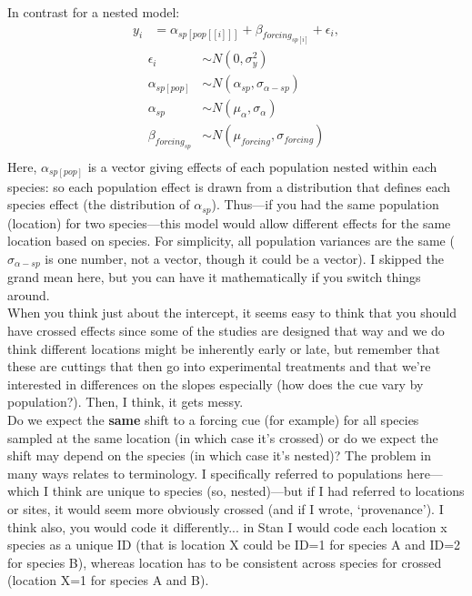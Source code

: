 \documentclass[11pt,letter]{article}
\begin{document}
In contrast for a nested model:
\begin{align*}
y_i &= \alpha_{sp[pop[[i]]]} + \beta_{forcing_{sp[i]}}  + \epsilon_i,
\end{align*}
\begin{align*}
\epsilon_i & \sim N(0,\sigma^2_y) \\
\alpha_{sp[pop]} & \sim N(\alpha_{sp}, \sigma_{\alpha-sp}) \\
\alpha_{sp} & \sim N(\mu_{\alpha}, \sigma_{\alpha}) \\
\beta_{forcing_{sp}} & \sim N(\mu_{forcing}, \sigma_{forcing}) \\
\end{align*}
Here, $\alpha_{sp[pop]}$ is a vector giving effects of each population nested within each species: so each population effect is drawn from a distribution that defines each species effect (the distribution of $\alpha_{sp}$). Thus---if you had the same population (location) for two species---this model would allow different effects for the same location based on species. For simplicity, all population variances are the same ($\sigma_{\alpha-sp}$ is one number, not a vector, though it could be a vector). I skipped the grand mean here, but you can have it mathematically if you switch things around. \\

When you think just about the intercept, it seems easy to think that you should have crossed effects since some of the studies are designed that way and we do think different locations might be inherently early or late, but remember that these are cuttings that then go into experimental treatments and that we're interested in differences on the slopes especially (how does the cue vary by population?). Then, I think, it gets messy.\\

Do we expect the {\bf same} shift to a forcing cue (for example) for all species sampled at the same location (in which case it's crossed) or do we expect the shift may depend on the species (in which case it's nested)? The problem in many ways relates to terminology. I specifically referred to populations here---which I think are unique to species (so, nested)---but if I had referred to locations or sites, it would seem more obviously crossed (and if I wrote, `provenance'). I think also, you would code it differently... in Stan I would code each location x species as a unique ID (that is location X could be ID=1 for species A and ID=2 for species B), whereas location has to be consistent across species for crossed (location X=1 for species A and B). \\
\end{document}
